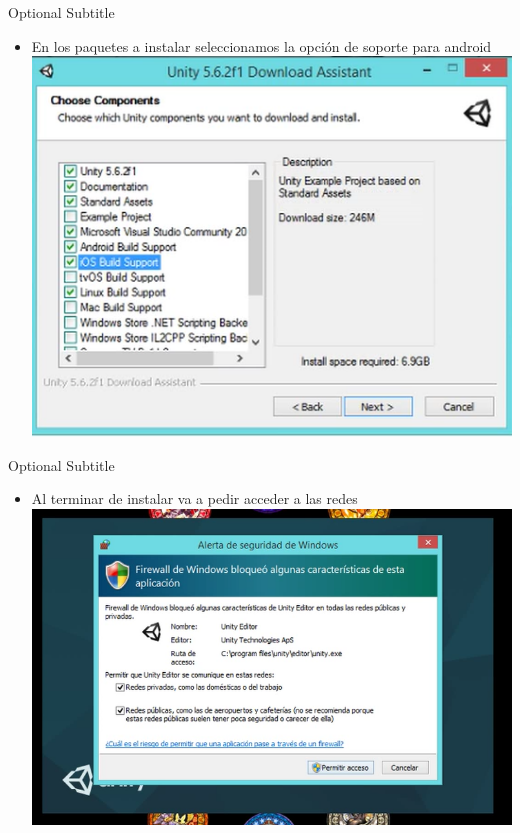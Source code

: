 \documentclass{beamer}
\begin{document}
\begin{frame}{03}{Optional Subtitle}
  \begin{itemize}
  \item {
    En los paquetes a instalar seleccionamos la opción de soporte para android
  }
  \includegraphics[width=\linewidth, height=0.7\paperheight]{image/IU03}
  \end{itemize}
\end{frame}

\begin{frame}{04}{Optional Subtitle}
  \begin{itemize}
  \item {
    Al terminar de instalar va a pedir acceder a las redes
  }
  \includegraphics[width=\linewidth]{image/IU04}

  \end{itemize}
\end{frame}
\end{document}
